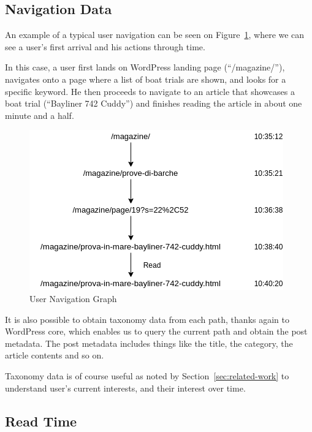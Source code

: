 \documentclass[sigconf,nonacm]{acmart}
\begin{document}
\subsection{Navigation Data}

An example of a typical user navigation can be seen on Figure~\ref{fig:user-navigation-graph}, where we can see a
user's first arrival and his actions through time.

In this case, a user first lands on WordPress landing page (``/magazine/''),
navigates onto a page where a list of boat trials are shown, and looks for a
specific keyword. He then proceeds to navigate to an article that showcases a
boat trial (``Bayliner 742 Cuddy'') and finishes reading the article in about
one minute and a half.

\begin{figure}[h]
  \centering
  \includegraphics[width=\linewidth]{Directed_Graph.png}
  \caption{User Navigation Graph}
  \label{fig:user-navigation-graph}
\end{figure}

It is also possible to obtain taxonomy data from each path, thanks
again to WordPress core, which enables us to query the current path and obtain
the post metadata. The post metadata includes things like the title, the category,
the article contents and so on.

Taxonomy data is of course useful as noted by Section~\ref{sec:related-work} to
understand user's current interests, and their interest over time.

\subsection{Read Time}
\end{document}
